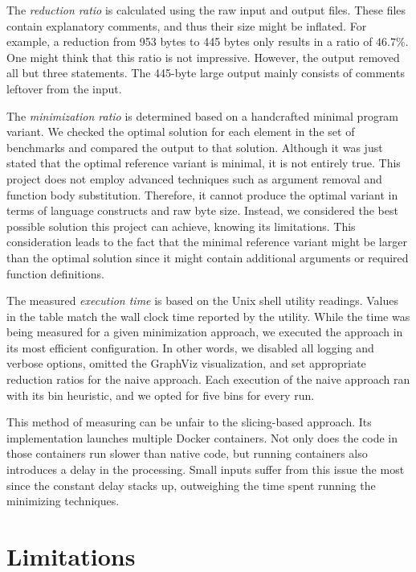 The \emph{reduction ratio} is calculated using the raw input and output 
files. 
These files contain explanatory comments, and thus their size might be 
inflated. 
For example, a reduction from 953 bytes to 445 bytes only results in a ratio 
of $46.7\%$. 
One might think that this ratio is not impressive. 
However, the output removed all but three statements. 
The 445-byte large output mainly consists of comments leftover from the input.

The \emph{minimization ratio} is determined based on a handcrafted minimal 
program variant. 
We checked the optimal solution for each element in the set of benchmarks and 
compared the output to that solution. 
Although it was just stated that the optimal reference variant is minimal, 
it is not entirely true. 
This project does not employ advanced techniques such as argument removal 
and function body substitution. 
Therefore, it cannot produce the optimal variant in terms of language 
constructs and raw byte size. 
Instead, we considered the best possible solution this project can achieve, 
knowing its limitations. 
This consideration leads to the fact that the minimal reference variant 
might be larger than the optimal solution since it might contain additional 
arguments or required function definitions.

The measured \emph{execution time} is based on the  Unix shell 
utility readings. 
Values in the table match the wall clock time reported by the utility. 
While the time was being measured for a given minimization approach, we 
executed the approach in its most efficient configuration. 
In other words, we disabled all logging and verbose options, omitted 
the GraphViz visualization, and set appropriate reduction ratios for 
the naive approach. 
Each execution of the naive approach ran with its bin heuristic, and we 
opted for five bins for every run. 

This method of measuring can be unfair to the slicing-based approach. 
Its implementation launches multiple Docker containers. 
Not only does the code in those containers run slower than native code, 
but running containers also introduces a delay in the processing. 
Small inputs suffer from this issue the most since the constant delay stacks 
up, outweighing the time spent running the minimizing techniques.

\section{Limitations}\label{chap:limitations}

